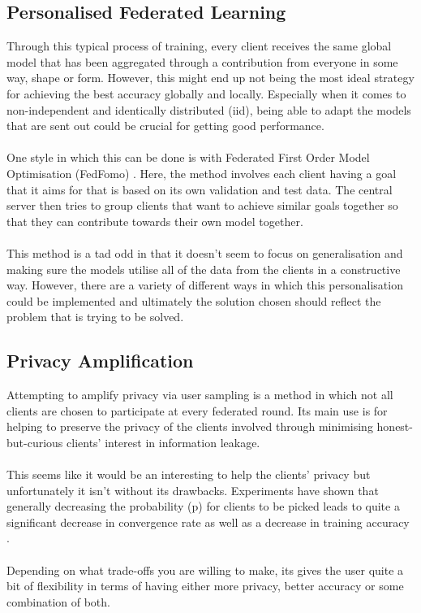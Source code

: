 \subsection{Personalised Federated Learning}
Through this typical process of training, every client receives the same global model that has been aggregated through a contribution from everyone in some way, shape or form.
However, this might end up not being the most ideal strategy for achieving the best accuracy globally and locally.
Especially when it comes to non-independent and identically distributed (iid), being able to adapt the models that are sent out could be crucial for getting good performance.
\\ \\
One style in which this can be done is with Federated First Order Model Optimisation (FedFomo) \cite{fedfomo}.
Here, the method involves each client having a goal that it aims for that is based on its own validation and test data.
The central server then tries to group clients that want to achieve similar goals together so that they can contribute towards their own model together.
\\ \\
This method is a tad odd in that it doesn't seem to focus on generalisation and making sure the models utilise all of the data from the clients in a constructive way.
However, there are a variety of different ways in which this personalisation could be implemented and ultimately the solution chosen should reflect the problem that is trying to be solved.


\subsection{Privacy Amplification}
Attempting to amplify privacy via user sampling is a method in which not all clients are chosen to participate at every federated round.
Its main use is for helping to preserve the privacy of the clients involved through minimising honest-but-curious clients' interest in information leakage.
\\ \\
This seems like it would be an interesting to help the clients' privacy but unfortunately it isn't without its drawbacks.
Experiments have shown that generally decreasing the probability (p) for clients to be picked leads to quite a significant decrease in convergence rate as well as a decrease in training accuracy \cite{privamp}.
\\ \\
Depending on what trade-offs you are willing to make, its gives the user quite a bit of flexibility in terms of having either more privacy, better accuracy or some combination of both.



